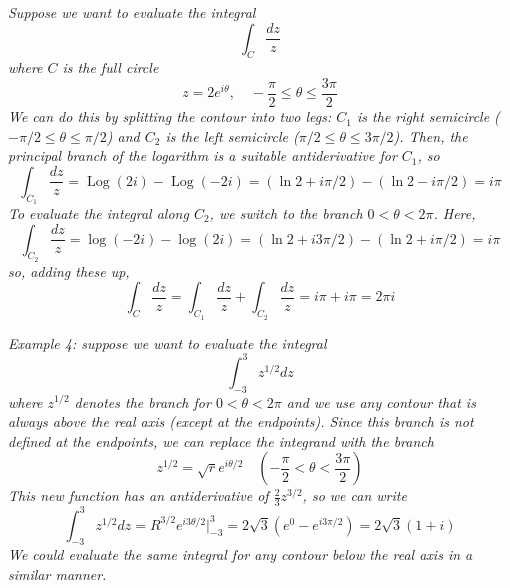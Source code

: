 \documentclass{article}
\DeclareMathOperator{\Log}{Log}
\begin{document}
\textit{Suppose we want to evaluate the integral
\[
	\int_C \frac{dz}{z} 
\]
where $C$ is the full circle
\[
	z = 2e^{i\theta},	\quad -\frac{\pi}{2} \le \theta \le \frac{3\pi}{2}
\]
We can do this by splitting the contour into two legs: $C_1$ is the right semicircle ($-\pi/2 \le \theta \le \pi/2$) and $C_2$ is the left semicircle ($\pi/2 \le \theta \le 3\pi/2$). Then, the principal branch of the logarithm is a suitable antiderivative for $C_1$, so
\[
	\int_{C_1} \frac{dz}{z}
	= \Log(2i) - \Log(-2i) 
	= (\ln 2 + i\pi/2) - (\ln 2 - i\pi/2)
	= i\pi
\]
To evaluate the integral along $C_2$, we switch to the branch $0 < \theta < 2\pi$. Here,
\[
	\int_{C_2} \frac{dz}{z}
	= \log(-2i) - \log(2i)
	= (\ln 2 + i3\pi/2) - (\ln 2 + i\pi/2) 
	= i\pi
\]
so, adding these up,
\[
	\int_C \frac{dz}{z}
	= \int_{C_1} \frac{dz}{z} + \int_{C_2} \frac{dz}{z} 
	= i \pi + i \pi
	= 2\pi i
\]}

\textit{Example 4: suppose we want to evaluate the integral
\[
	\int_{-3}^{3} z^{1/2} dz
\]
where $z^{1/2}$ denotes the branch for $0 < \theta < 2\pi$ and we use any contour that is always above the real axis (except at the endpoints). Since this branch is not defined at the endpoints, we can replace the integrand with the branch
\[
	z^{1/2} = \sqrt{r} e^{i\theta/2}
	\quad (-\frac{\pi}{2} < \theta < \frac{3\pi}{2})
\]
This new function has an antiderivative of $\frac{2}{3} z^{3/2}$, so we can write
\[
	\int_{-3}^{3} z^{1/2} dz
	= R^{3/2} e^{i3\theta/2} \Big|_{-3}^3
	= 2\sqrt{3} (e^0 - e^{i3\pi/2})
	= 2\sqrt{3} (1 + i)
\]	
We could evaluate the same integral for any contour below the real axis in a similar manner.}
\end{document}
